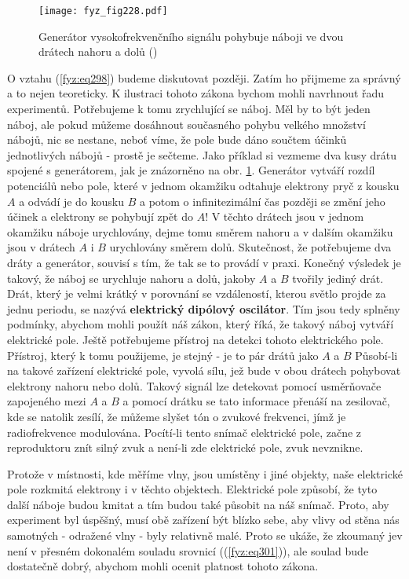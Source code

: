     \begin{figure}[ht!] %
      \centering
      \texttt{[image: fyz\_fig228.pdf]}
      \caption{Generátor vysokofrekvenčního signálu pohybuje náboji ve dvou drátech nahoru a dolů
               (\cite[s.~375]{Feynman01})}
      \label{fyz:fig228}
    \end{figure}
    
    O vztahu (\ref{fyz:eq298}) budeme diskutovat později. Zatím ho přijmeme za správný a to nejen 
    teoreticky. K ilustraci tohoto zákona bychom mohli navrhnout řadu experimentů. Potřebujeme k 
    tomu zrychlující se náboj. Měl by to být jeden náboj, ale pokud můžeme dosáhnout současného 
    pohybu velkého množství nábojů, nic se nestane, neboť víme, že pole bude dáno součtem účinků 
    jednotlivých nábojů - prostě je sečteme. Jako příklad si vezmeme dva kusy drátu spojené s 
    generátorem, jak je znázorněno na obr. \ref{fyz:fig228}. Generátor vytváří rozdíl potenciálů 
    nebo pole, které v jednom okamžiku odtahuje elektrony pryč z kousku \(A\) a odvádí je do kousku 
    \(B\) a potom o infinitezimální čas později se změní jeho účinek a elektrony se pohybují zpět 
    do \(A\)! V těchto drátech jsou v jednom okamžiku náboje urychlovány, dejme tomu směrem nahoru 
    a v dalším okamžiku jsou v drátech \(A\) i \(B\) urychlovány směrem dolů. Skutečnost, že 
    potřebujeme dva dráty a generátor, souvisí s tím, že tak se to provádí v praxi. Konečný 
    výsledek je takový, že náboj se urychluje nahoru a dolů, jakoby \(A\) a \(B\) tvořily jediný 
    drát. Drát, který je velmi krátký v porovnání se vzdáleností, kterou světlo projde za jednu 
    periodu, se nazývá \textbf{elektrický dipólový oscilátor}. Tím jsou tedy splněny podmínky, 
    abychom mohli použít náš zákon, který říká, že takový náboj vytváří elektrické pole. Ještě 
    potřebujeme přístroj na detekci tohoto elektrického pole. Přístroj, který k tomu použijeme, je 
    stejný - je to pár drátů jako \(A\) a \(B\) Působí-li na takové zařízení elektrické pole, 
    vyvolá sílu, jež bude v obou drátech pohybovat elektrony nahoru nebo dolů. Takový signál lze 
    detekovat pomocí usměrňovače zapojeného mezi \(A\) a \(B\) a pomocí drátku se tato informace 
    přenáší na zesilovač, kde se natolik zesílí, že můžeme slyšet tón o zvukové frekvenci, jímž je 
    radiofrekvence modulována. Pocítí-li tento snímač elektrické pole, začne z reproduktoru znít 
    silný zvuk a není-li zde elektrické pole, zvuk nevznikne.

    Protože v místnosti, kde měříme vlny, jsou umístěny i jiné objekty, naše elektrické pole 
    rozkmitá elektrony i v těchto objektech. Elektrické pole způsobí, že tyto další náboje budou 
    kmitat a tím budou také působit na náš snímač. Proto, aby experiment byl úspěšný, musí obě 
    zařízení být blízko sebe, aby vlivy od stěna nás samotných - odražené vlny - byly relativně 
    malé. Proto se ukáže, že zkoumaný jev není v přesném dokonalém souladu srovnicí 
    ((\ref{fyz:eq301})), ale soulad bude dostatečně dobrý, abychom mohli ocenit platnost tohoto 
    zákona.
    
